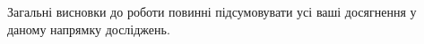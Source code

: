 Загальні висновки до роботи повинні підсумовувати усі ваші досягнення у 
даному напрямку досліджень.




